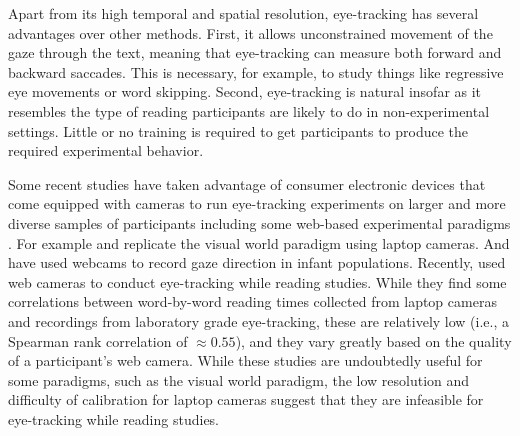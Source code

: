 \documentclass[12pt]{article}
\begin{document}
Apart from its high temporal and spatial resolution, eye-tracking has several advantages over other methods. First, it allows unconstrained movement of the gaze through the text, meaning that eye-tracking can measure both forward and backward saccades. This is necessary, for example, to study things like regressive eye movements or word skipping. Second, eye-tracking is natural insofar as it resembles the type of reading participants are likely to do in non-experimental settings. Little or no training is required to get participants to produce the required experimental behavior.


Some recent studies have taken advantage of consumer electronic devices that come equipped with cameras to run eye-tracking experiments on larger and more diverse samples of participants including some web-based experimental paradigms \citep{Papoutsaki2016WebGazerSW, xu2015turkergaze, semmelmann2018online}. For example \citet{degen2021seeing} and  \citet{Vos2022ComparingIA} replicate the visual world paradigm using laptop cameras. And \citet{werchan2022owlet} have used webcams to record gaze direction in infant populations. Recently, \citet{ribeiro2023webqamgaze} used web cameras to conduct eye-tracking while reading studies. While they find some correlations between word-by-word reading times collected from laptop cameras and recordings from laboratory grade eye-tracking, these are relatively low (i.e., a Spearman rank correlation of $\approx 0.55$), and they vary greatly based on the quality of a participant's web camera. While these studies are undoubtedly useful for some paradigms, such as the visual world paradigm, the low resolution and difficulty of calibration for laptop cameras suggest that they are infeasible for eye-tracking while reading studies. %
\end{document}
